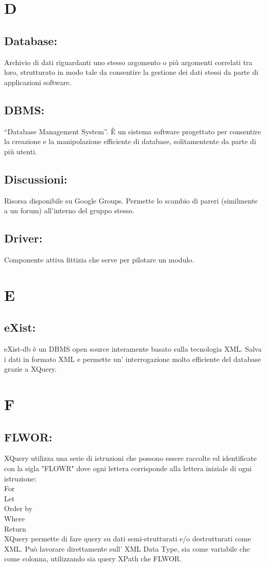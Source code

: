 \chapter{D}
\section{Database:}
Archivio di dati riguardanti uno stesso argomento o pi\`u argomenti correlati tra loro, strutturato in modo tale da consentire la gestione dei dati stessi da parte di applicazioni software.
\section{DBMS:}
``Database Management System''. \`E un sistema software progettato per consentire la creazione e la manipolazione efficiente di database, solitamentente da parte di pi\`u utenti.
\section{Discussioni:}
Risorsa disponibile su Google Groups. Permette lo scambio di pareri (similmente a un forum) all'interno del gruppo stesso.
\section{Driver:}
Componente attiva fittizia che serve per pilotare un modulo.

\chapter{E}
\section{eXist:}
eXist-db \`e un DBMS open source interamente basato sulla tecnologia XML. Salva i dati in formato XML e permette un' interrogazione molto efficiente del database grazie a XQuery.

\chapter{F}
\section{FLWOR:}
XQuery utilizza una serie di istruzioni che possono essere raccolte ed identificate con la sigla "FLOWR" dove ogni lettera corrisponde alla lettera iniziale di ogni istruzione:\\
For \\
Let \\
Order by \\
Where \\
Return \\
XQuery permette di fare query su dati semi-strutturati e/o destrutturati come XML. Pu\`o lavorare direttamente sull' XML Data Type, sia come variabile che come colonna, utilizzando sia query XPath che FLWOR.

